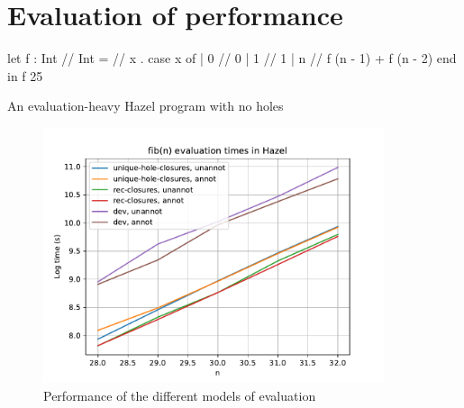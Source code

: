 \chapter{Evaluation of performance}
\label{sec:evaluation}

\begin{listing}
\begin{hminted}
let f : Int /\rar/ Int =
  /\lbd/ x . {
    case x of
    | 0 /\Rar/ 0
    | 1 /\Rar/ 1
    | n /\Rar/ f (n - 1) + f (n - 2)
    end
  }
in f 25  
\end{hminted}
\caption{An evaluation-heavy Hazel program with no holes}
\end{listing}

\begin{figure}
  \centering
  \includegraphics[width=10cm]{img/subst_evalenv_fib_perf.pdf}
  \caption{Performance of the different models of evaluation}
  \label{fig:perf_evaluation_models}
\end{figure}





